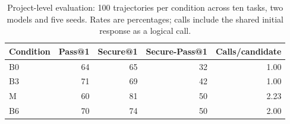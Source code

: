 \begin{table}[pos=htbp]
\centering
\caption{Project-level evaluation: 100 trajectories per condition across ten tasks, two models and five seeds. Rates are percentages; calls include the shared initial response as a logical call.}
\label{tab:supp-external-projects}
\begin{tabular}{lrrrr}
\toprule
Condition & Pass@1 & Secure@1 & \textbf{Secure-Pass@1} & Calls/candidate \\
\midrule
B0 & 64 & 65 & 32 & 1.00 \\
B3 & 71 & 69 & 42 & 1.00 \\
M  & 60 & 81 & 50 & 2.23 \\
B6 & 70 & 74 & 50 & 2.00 \\
\bottomrule
\end{tabular}
\end{table}
